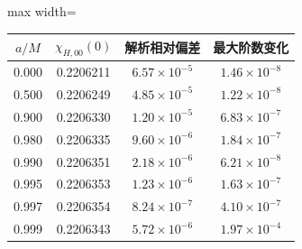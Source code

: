 \documentclass[UTF8,fontset=fandol,11pt,a4paper]{ctexart}
\begin{document}
\par\addvspace{12pt}\noindent\begin{minipage}{\linewidth}
\centering\fontsize{9.5}{12}\selectfont\setlength{\tabcolsep}{3pt}\renewcommand{\arraystretch}{1.18}
\label{audit:tab:l0-zero-frequency}
\begin{adjustbox}{max width=\linewidth}
\begin{tabular}{c c c c}
\toprule
$a/M$ & $\chi_{H,00}(0)$ & 解析相对偏差
& 最大阶数变化\\
\midrule
0.000 & 0.2206211 & $6.57\times10^{-5}$ & $1.46\times10^{-8}$\\
0.500 & 0.2206249 & $4.85\times10^{-5}$ & $1.22\times10^{-8}$\\
0.900 & 0.2206330 & $1.20\times10^{-5}$ & $6.83\times10^{-7}$\\
0.980 & 0.2206335 & $9.60\times10^{-6}$ & $1.84\times10^{-7}$\\
0.990 & 0.2206351 & $2.18\times10^{-6}$ & $6.21\times10^{-8}$\\
0.995 & 0.2206353 & $1.23\times10^{-6}$ & $1.63\times10^{-7}$\\
0.997 & 0.2206354 & $8.24\times10^{-7}$ & $4.10\times10^{-7}$\\
0.999 & 0.2206343 & $5.72\times10^{-6}$ & $1.97\times10^{-4}$\\
\bottomrule\end{tabular}\end{adjustbox}
\end{minipage}\par\addvspace{9pt}
\end{document}
